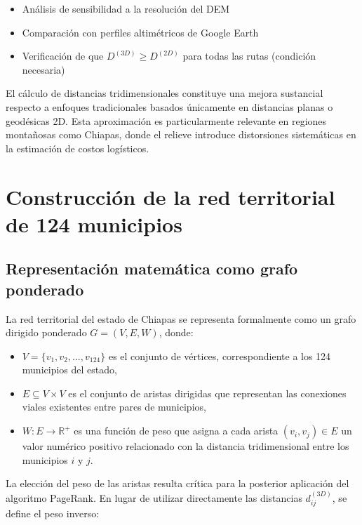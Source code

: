 \documentclass[
  spanish,
  us-letterpaper,
]{scrreprt}
\providecommand{\tightlist}{%
  \setlength{\itemsep}{0pt}\setlength{\parskip}{0pt}}
\numberwithin{equation}{section}
\begin{document}
\begin{itemize}
\tightlist
\item
  Análisis de sensibilidad a la resolución del DEM
\item
  Comparación con perfiles altimétricos de Google Earth
\item
  Verificación de que \(D^{(3D)} \geq D^{(2D)}\) para todas las rutas
  (condición necesaria)
\end{itemize}

El cálculo de distancias tridimensionales constituye una mejora
sustancial respecto a enfoques tradicionales basados únicamente en
distancias planas o geodésicas 2D. Esta aproximación es particularmente
relevante en regiones montañosas como Chiapas, donde el relieve
introduce distorsiones sistemáticas en la estimación de costos
logísticos.

\section{Construcción de la red territorial de 124
municipios}\label{construcciuxf3n-de-la-red-territorial-de-124-municipios}

\subsection{Representación matemática como grafo
ponderado}\label{representaciuxf3n-matemuxe1tica-como-grafo-ponderado}

La red territorial del estado de Chiapas se representa formalmente como
un grafo dirigido ponderado \(G = (V, E, W)\), donde:

\begin{itemize}
\tightlist
\item
  \(V = \{v_1, v_2, \dots, v_{124}\}\) es el conjunto de vértices,
  correspondiente a los 124 municipios del estado,
\item
  \(E \subseteq V \times V\) es el conjunto de aristas dirigidas que
  representan las conexiones viales existentes entre pares de
  municipios,
\item
  \(W: E \to \mathbb{R}^+\) es una función de peso que asigna a cada
  arista \((v_i, v_j) \in E\) un valor numérico positivo relacionado con
  la distancia tridimensional entre los municipios \(i\) y \(j\).
\end{itemize}

La elección del peso de las aristas resulta crítica para la posterior
aplicación del algoritmo PageRank. En lugar de utilizar directamente las
distancias \(d_{ij}^{(3D)}\), se define el peso inverso:
\end{document}
